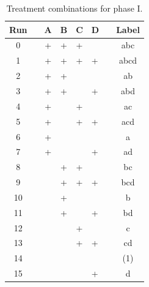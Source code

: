 \begin{table}[h]
\centering
\begin{tabular}{@{}clccclcc@{}}
\toprule
\textbf{Run} &  & \textbf{A} & \textbf{B} & \textbf{C} & \textbf{D} &  & \textbf{Label} \\ \midrule
0  &  &  +  &  +  &  +  &     &  & abc   \\
1  &  &  +  &  +  &  +  &  +  &  & abcd  \\
2  &  &  +  &  +  &     &     &  & ab    \\
3  &  &  +  &  +  &     &  +  &  & abd   \\
4  &  &  +  &     &  +  &     &  & ac    \\
5  &  &  +  &     &  +  &  +  &  & acd   \\
6  &  &  +  &     &     &     &  & a     \\
7  &  &  +  &     &     &  +  &  & ad    \\
8  &  &     &  +  &  +  &     &  & bc    \\
9  &  &     &  +  &  +  &  +  &  & bcd   \\
10 &  &     &  +  &     &     &  & b     \\
11 &  &     &  +  &     &  +  &  & bd    \\
12 &  &     &     &  +  &     &  & c     \\
13 &  &     &     &  +  &  +  &  & cd    \\
14 &  &     &     &     &     &  & (1)   \\
15 &  &     &     &     &  +  &  & d     \\ \bottomrule
\end{tabular}
\caption{Treatment combinations for phase I.}
\label{tab:p1-runs}
\end{table}